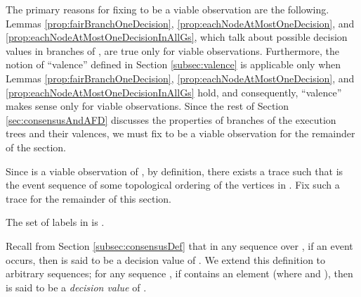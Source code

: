 \documentclass[11pt]{article}
\numberwithin{theorem}{section}
\begin{document}
The primary reasons for fixing  to be a viable observation are the following. Lemmas \ref{prop:fairBranchOneDecision}, \ref{prop:eachNodeAtMostOneDecision}, and \ref{prop:eachNodeAtMostOneDecisionInAllGs}, which talk about possible decision values in branches of , are true only for viable observations. Furthermore, the notion of ``valence'' defined in Section \ref{subsec:valence} is applicable only when Lemmas \ref{prop:fairBranchOneDecision}, \ref{prop:eachNodeAtMostOneDecision}, and \ref{prop:eachNodeAtMostOneDecisionInAllGs} hold, and consequently, ``valence'' makes sense only for viable observations. Since the rest of Section \ref{sec:consensusAndAFD} discusses the properties of branches of the execution trees and their valences, we must fix  to be a viable observation for the remainder of the section.



Since  is a viable observation of , by definition, there exists a trace  such that
 is the event sequence of some topological ordering of the
vertices in . Fix such a trace  for the remainder of this section.

The set  of labels in   is . 

Recall from Section \ref{subsec:consensusDef} that in any sequence 
over , if an event  occurs, then  is
said to be a decision value of . We extend this definition to
arbitrary sequences; for any sequence , if  contains an element
 (where  and ), then  is
said to be a \emph{decision value} of .
\end{document}
